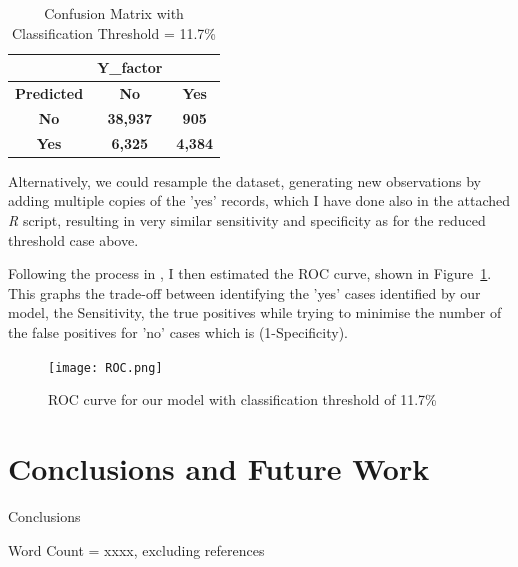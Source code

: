 \documentclass[9pt,technote]{IEEEtran}
\begin{document}
\begin{table}[htbp]
\begin{center}
\begin{tabular}{|c|c|c|}
\hline
& \textbf{Y\_factor}&\\
\hline
\textbf{Predicted}&{\textbf{No}}&{\textbf{Yes}} \\
\hline
\textbf{No}&{\textbf{38,937}}&{\textbf{905}} \\
\hline
\textbf{Yes}&{\textbf{6,325}}&{\textbf{4,384}} \\
\hline
\end{tabular}
\label{tab2}
\caption{Confusion Matrix with Classification Threshold = 11.7\%}
\end{center}
\end{table}

Alternatively, we could resample the dataset, generating new observations by adding multiple copies of the 'yes' records, which I have done also in the attached \textit{R} script, resulting in very similar sensitivity and specificity as for the reduced threshold case above.  

Following the process in \cite{lantz15}, I then estimated the ROC curve, shown in Figure~\ref{fig:ROC}.  This graphs the trade-off between identifying the 'yes' cases identified by our model, the Sensitivity, the true positives while trying to minimise the number of the false positives for 'no' cases which is (1-Specificity).  

\begin{figure}[htbp]
\centerline{\texttt{[image: ROC.png]}}
\caption{ROC curve for our model with classification threshold of 11.7\%}
\label{fig:ROC}
\end{figure}

\section{Conclusions and Future Work}

Conclusions

Word Count = xxxx, excluding references



\end{document}
